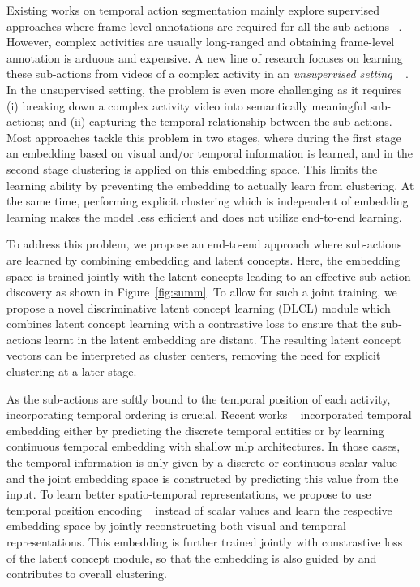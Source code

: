 \documentclass[final]{cvpr}
\begin{document}
\par Existing works on temporal action segmentation mainly explore supervised approaches where frame-level annotations are required for all the sub-actions ~\cite{farha2019ms, bf-Kuehne12, rl-c-yeung2016end, kuehne2016end, kuehne2018hybrid, rl-c-shou2017cdc, Lea_2017_CVPR}.
However, complex activities are usually long-ranged and obtaining frame-level annotation is arduous and expensive. 
A new line of research focuses on learning these sub-actions from videos of a complex activity in an {\em unsupervised setting} ~\cite{aakur2019perceptual, Alayrac16unsupervised,  kukleva2019unsupervised, sener2018unsupervised, vidalmata2020joint} .
In the unsupervised setting, the problem is even more challenging as it requires (i) breaking down a complex activity video into semantically meaningful sub-actions; and (ii) capturing the temporal relationship between the sub-actions. 
Most approaches tackle this problem in two stages, where during the first stage an embedding based on visual and/or temporal information is learned, and in the second stage clustering is applied on this embedding space. This limits the learning ability by preventing the embedding to actually learn from clustering. At the same time, performing explicit clustering which is independent of embedding learning makes the model less efficient and does not utilize end-to-end learning.

\par To address this problem, we propose an end-to-end approach where sub-actions are learned by combining embedding and latent concepts. Here, the embedding space is trained jointly with the latent concepts leading to an effective sub-action discovery as shown in Figure~\ref{fig:summ}. To allow for such a joint training, we propose a novel discriminative latent concept learning (DLCL) module which combines latent concept learning with a contrastive loss to ensure that the sub-actions learnt in the latent embedding are distant. The resulting latent concept vectors can be interpreted as cluster centers, removing the need for explicit clustering at a later stage.

\par As the sub-actions are softly bound to the temporal position of each activity, incorporating temporal ordering is crucial. Recent works ~\cite{sener2018unsupervised, kukleva2019unsupervised} incorporated temporal embedding either by predicting the discrete temporal entities or by learning continuous temporal embedding with shallow {\sc mlp} architectures. 
In those cases, the temporal information is only given by a discrete or continuous scalar value and the joint embedding space is constructed by predicting this value from the input. 
To learn better spatio-temporal representations, we propose to use temporal position encoding ~\cite{vaswani2017attention} instead of scalar values and learn the respective embedding space by jointly reconstructing both visual and temporal representations. This embedding is further trained jointly with constrastive loss of the latent concept module, so that the embedding is also guided by and contributes to overall clustering. 
\end{document}
